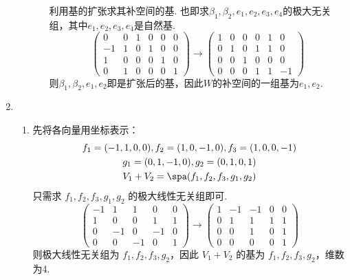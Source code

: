 \begin{enumerate}
\begin{enumerate}
\begin{enumerate}
                              利用基的扩张求其补空间的基. 也即求$\beta_1,\beta_2,e_1,e_2,e_3,e_4$的极大无关组，其中$e_1,e_2,e_3,e_4$是自然基.
                              \[\begin{pmatrix}
                                      0  & 0 & 1 & 0 & 0 & 0 \\
                                      -1 & 1 & 0 & 1 & 0 & 0 \\
                                      1  & 0 & 0 & 0 & 1 & 0 \\
                                      0  & 1 & 0 & 0 & 0 & 1
                                  \end{pmatrix}\rightarrow
                                  \begin{pmatrix}1 & 0 & 0 & 0 & 1 & 0  \\
               0 & 1 & 0 & 1 & 1 & 0  \\
               0 & 0 & 1 & 0 & 0 & 0  \\
               0 & 0 & 0 & 1 & 1 & -1
                                  \end{pmatrix}\]
                              则$\beta_1,\beta_2,e_1,e_2$即是扩张后的基，因此$W$的补空间的一组基为$e_1,e_2$.
                    \end{enumerate}
          \end{enumerate}

    \item \begin{enumerate}
              \item 先将各向量用坐标表示：
                    \begin{gather*}
                        f_1=(-1,1,0,0),f_2=(1,0,-1,0),f_3=(1,0,0,-1) \\
                        g_1=(0,1,-1,0),g_2=(0,1,0,1) \\
                        V_1+V_2=\spa(f_1,f_2,f_3,g_1,g_2)
                    \end{gather*}
                    只需求 $f_1,f_2,f_3,g_1,g_2$ 的极大线性无关组即可.
                    \[\begin{pmatrix}
                            -1 & 1  & 1  & 0  & 0 \\
                            1  & 0  & 0  & 1  & 1 \\
                            0  & -1 & 0  & -1 & 0 \\
                            0  & 0  & -1 & 0  & 1
                        \end{pmatrix}\rightarrow
                        \begin{pmatrix}1 & -1 & -1 & 0 & 0 \\
               0 & 1  & 1  & 1 & 1 \\
               0 & 0  & 1  & 0 & 1 \\
               0 & 0  & 0  & 0 & 1
                        \end{pmatrix}\]
                    则极大线性无关组为 $f_1,f_2,f_3,g_2$，因此 $V_1+V_2$ 的基为 $f_1,f_2,f_3,g_2$，维数为4.


\end{enumerate}
\end{enumerate}
